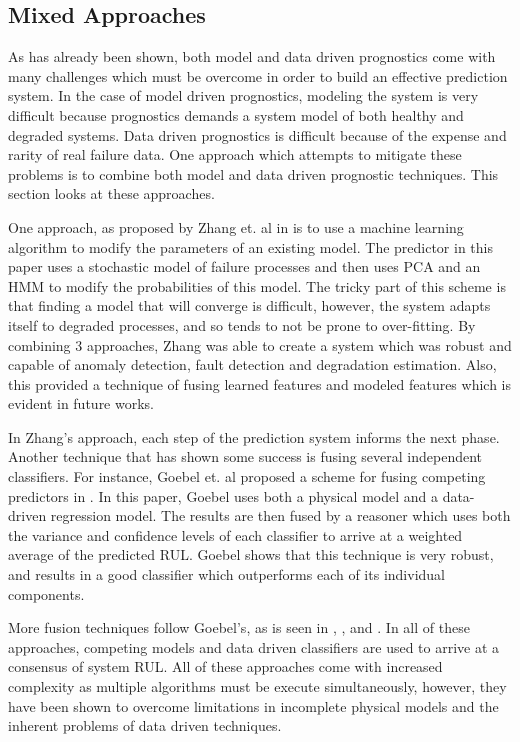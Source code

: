 \documentclass[12pt]{article}
\begin{document}
\subsection{Mixed Approaches}
As has already been shown, both model and data driven prognostics come with
many challenges which must be overcome in order to build an effective
prediction system.  In the case of model driven prognostics, modeling the
system is very difficult because prognostics demands a system model of both
healthy and degraded systems.  Data driven prognostics is difficult because of
the expense and rarity of real failure data.  One approach which attempts to
mitigate these problems is to combine both model and data driven prognostic
techniques.  This section looks at these approaches.

One approach, as proposed by Zhang et. al in \cite{1470385} is to use a machine
learning algorithm to modify the parameters of an existing model.  The
predictor in this paper uses a stochastic model of failure processes and then
uses PCA and an HMM to modify the probabilities of this model.  The tricky part
of this scheme is that finding a model that will converge is difficult,
however, the system adapts itself to degraded processes, and so tends to not be
prone to over-fitting.  By combining 3 approaches, Zhang was able to create a
system which was robust and capable of anomaly detection, fault detection and
degradation estimation.  Also, this provided a technique of fusing learned
features and modeled features which is evident in future works.

In Zhang's approach, each step of the prediction system informs the next phase.
Another technique that has shown some success is fusing several independent
classifiers.  For instance, Goebel et. al proposed a scheme for fusing
competing predictors in \cite{1656116}.  In this paper, Goebel uses both a
physical model and a data-driven regression model.  The results are then fused
by a reasoner which uses both the variance and confidence levels of each
classifier to arrive at a weighted average of the predicted RUL.  Goebel shows
that this technique is very robust, and results in a good classifier which
outperforms each of its individual components.

More fusion techniques follow Goebel's, as is seen in \cite{6299507},
\cite{6113902}, and \cite{6024361}.  In all of these approaches, competing
models and data driven classifiers are used to arrive at a consensus of system
RUL.  All of these approaches come with increased complexity as multiple
algorithms must be execute simultaneously, however, they have been shown to
overcome limitations in incomplete physical models and the inherent problems of
data driven techniques.
\end{document}
